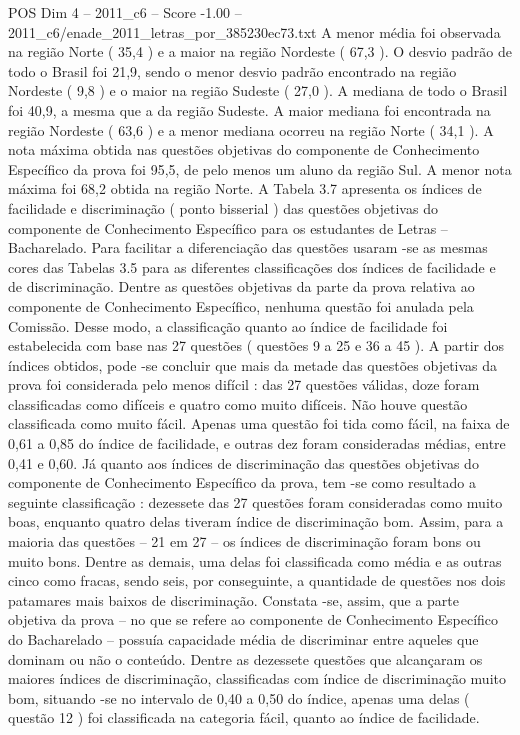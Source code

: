 \begin{textsample}{POS Dim 4 – 2011\_c6 – Score -1.00 – 2011\_c6/enade\_2011\_letras\_por\_385230ec73.txt}
A menor média foi observada na região Norte ( 35,4 ) e a maior na região Nordeste ( 67,3 ).
O desvio padrão de todo o Brasil foi 21,9, sendo o menor desvio padrão encontrado na região Nordeste ( 9,8 ) e o maior na região Sudeste ( 27,0 ).
A mediana de todo o Brasil foi 40,9, a mesma que a da região Sudeste.
A maior mediana foi encontrada na região Nordeste ( 63,6 ) e a menor mediana ocorreu na região Norte ( 34,1 ).
A nota máxima obtida nas questões objetivas do componente de Conhecimento Específico da prova foi 95,5, de pelo menos um aluno da região Sul.
A menor nota máxima foi 68,2 obtida na região Norte.
A Tabela 3.7 apresenta os índices de facilidade e discriminação ( ponto bisserial ) das questões objetivas do componente de Conhecimento Específico para os estudantes de Letras – Bacharelado.
Para facilitar a diferenciação das questões usaram -se as mesmas cores das Tabelas 3.5 para as diferentes classificações dos índices de facilidade e de discriminação.
Dentre as questões objetivas da parte da prova relativa ao componente de Conhecimento Específico, nenhuma questão foi anulada pela Comissão.
Desse modo, a classificação quanto ao índice de facilidade foi estabelecida com base nas 27 questões ( questões 9 a 25 e 36 a 45 ).
A partir dos índices obtidos, pode -se concluir que mais da metade das questões objetivas da prova foi considerada pelo menos difícil : das 27 questões válidas, doze foram classificadas como difíceis e quatro como muito difíceis.
Não houve questão classificada como muito fácil.
Apenas uma questão foi tida como fácil, na faixa de 0,61 a 0,85 do índice de facilidade, e outras dez foram consideradas médias, entre 0,41 e 0,60.
Já quanto aos índices de discriminação das questões objetivas do componente de Conhecimento Específico da prova, tem -se como resultado a seguinte classificação : dezessete das 27 questões foram consideradas como muito boas, enquanto quatro delas tiveram índice de discriminação bom.
Assim, para a maioria das questões – 21 em 27 – os índices de discriminação foram bons ou muito bons.
Dentre as demais, uma delas foi classificada como média e as outras cinco como fracas, sendo seis, por conseguinte, a quantidade de questões nos dois patamares mais baixos de discriminação.
Constata -se, assim, que a parte objetiva da prova – no que se refere ao componente de Conhecimento Específico do Bacharelado – possuía capacidade média de discriminar entre aqueles que dominam ou não o conteúdo.
Dentre as dezessete questões que alcançaram os maiores índices de discriminação, classificadas com índice de discriminação muito bom, situando -se no intervalo de 0,40 a 0,50 do índice, apenas uma delas ( questão 12 ) foi classificada na categoria fácil, quanto ao índice de facilidade.

\end{textsample}

